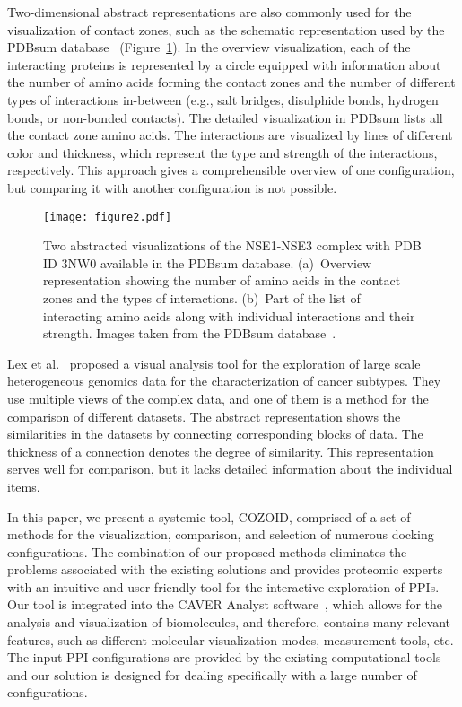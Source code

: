 \documentclass[twocolumn]{bmcart}%
\begin{document}
Two-dimensional abstract representations are also commonly used for the visualization of contact zones, such as the schematic representation used by the PDBsum database~\cite{pdbsum} (Figure~\ref{fig:pdbsum}).
In the overview visualization, each of the interacting proteins is represented by a circle equipped with information about the number of amino acids forming the contact zones and the number of different types of interactions in-between (e.g., salt bridges, disulphide bonds, hydrogen bonds, or non-bonded contacts).
The detailed visualization in PDBsum lists all the contact zone amino acids. 
The interactions are visualized by lines of different color and thickness, which represent the type and strength of the interactions, respectively. 
This approach gives a comprehensible overview of one configuration, but comparing it with another configuration is not possible.

\begin{figure}[tb]
  \centering	
  \texttt{[image: figure2.pdf]}
  \caption{ Two abstracted visualizations of the NSE1-NSE3 complex with PDB ID 3NW0 available in the PDBsum database. (a)~Overview representation showing the number of amino acids in the contact zones and the types of interactions. (b)~Part of the list of interacting amino acids along with individual interactions and their strength. Images taken from the PDBsum database~\cite{pdbsum}.}
    \label{fig:pdbsum}
\end{figure}

Lex et al.~\cite{Lex2012} proposed a visual analysis tool for the exploration of large scale heterogeneous genomics data for the characterization of cancer subtypes.
They use multiple views of the complex data, and one of them is a method for the comparison of different datasets.
The abstract representation shows the similarities in the datasets by connecting corresponding blocks of data. 
The thickness of a connection denotes the degree of similarity. 
This representation serves well for comparison, but it lacks detailed information about the individual items.

In this paper, we present a systemic tool, COZOID, comprised of a set of methods for the visualization, comparison, and selection of numerous docking configurations.
The combination of our proposed methods eliminates the problems associated with the existing solutions and provides proteomic experts with an intuitive and user-friendly tool for the interactive exploration of PPIs.
Our tool is integrated into the CAVER Analyst software~\cite{kozlikova2014caver}, which allows for the analysis and visualization of biomolecules, and therefore, contains many relevant features, such as different molecular visualization modes, measurement tools, etc.  
The input PPI configurations are provided by the existing computational tools and our solution is designed for dealing specifically with a large number of configurations.
\end{document}
